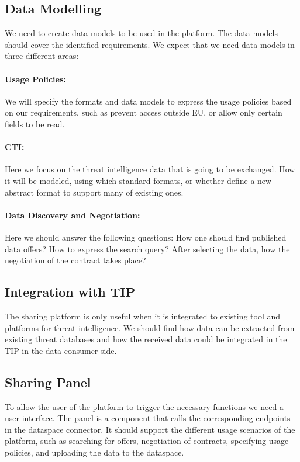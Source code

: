 \documentclass{article}
\begin{document}
\subsection{Data Modelling}
We need to create data models to be used in the platform. The data models should cover the identified requirements. We expect that we need data models in three different areas:

\paragraph{Usage Policies:} We will specify the formats and data models to express the usage policies based on our requirements, such as prevent access outside EU, or allow only certain fields to be read.

\paragraph*{CTI:} Here we focus on the threat intelligence data that is going to be exchanged. How it will be modeled, using which standard formats, or whether define a new abstract format to support many of existing ones.

\paragraph*{Data Discovery and Negotiation:} Here we should answer the following questions: How one should find published data offers? How to express the search query? After selecting the data, how the negotiation of the contract takes place?

\subsection{Integration with TIP} The sharing platform is only useful when it is integrated to existing tool and platforms for threat intelligence. We should find how data can be extracted from existing threat databases and how the received data could be integrated in the TIP in the data consumer side.

\subsection{Sharing Panel} 
To allow the user of the platform to trigger the necessary functions we need a user interface. The panel is a component that calls the corresponding endpoints in the dataspace connector. It should support the different usage scenarios of the platform, such as searching for offers, negotiation of contracts, specifying usage policies, and uploading the data to the dataspace.
\end{document}
